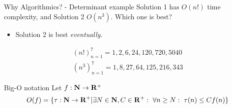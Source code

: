 \documentclass{beamer}
\begin{document}
%

\begin{frame}{Why Algorithmics? - Determinant example}
	Solution 1 has $O(n!)$ time complexity, and Solution 2 $O(n^3)$. Which one
	is best?

	\begin{itemize}
		\item Solution 2 is best \emph{eventually}.
	\end{itemize}

	\begin{eqnarray*}
		(n!)_{n=1}^{7} = 1, 2, 6, 24, 120, 720, 5040\\
		(n^3)_{n=1}^{7} = 1, 8, 27, 64, 125, 216, 343
	\end{eqnarray*}
\end{frame}

%

\begin{frame}{Big-O notation}
	Let $f : \mathbf{N} \to \mathbf{R}^+$
	\begin{equation*}
		O(f) = \{\tau : \mathbf{N} \to \mathbf{R}^+ | \exists N \in \mathbf{N}, C \in \mathbf{R}^+ : \ \forall n \geq N : \ \tau(n) \leq C f(n)\}
	\end{equation*}
\end{frame}
\end{document}
